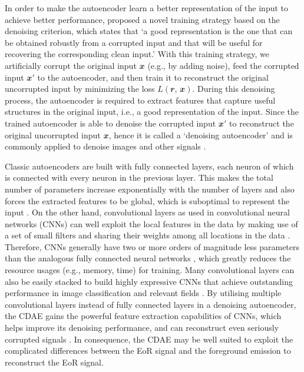 \documentclass[fleqn,usenatbib]{mnras}
\newcommand{\B}[1]{\mathbfit{#1}}
\newcommand{\editone}[1]{{\leavevmode\color{cyan}#1}}
\begin{document}
\editone{%
In order to make the autoencoder learn a better representation of the input
to achieve better performance, \citet{vincent2008,vincent2010} proposed a
novel training strategy based on the denoising criterion,
which states that `a good representation is the one that can be obtained
robustly from a corrupted input and that will be useful for recovering the
corresponding clean input.'
With this training strategy, we artificially corrupt the original input
$\B{x}$ (e.g., by adding noise), feed the corrupted input $\B{x}'$ to the
autoencoder, and then train it to reconstruct the original uncorrupted
input by minimizing the loss $L(\B{r}, \,\B{x})$.
During this denoising process, the autoencoder is required to extract
features that capture useful structures in the original input, i.e., a good
representation of the input.
Since the trained autoencoder is able to denoise the corrupted input
$\B{x}'$ to reconstruct the original uncorrupted input $\B{x}$, hence it is
called a `denoising autoencoder' and is commonly applied to denoise images
and other signals \citep[e.g.,][]{xie2012,bengio2013,gondara2016}.

Classic autoencoders are built with fully connected layers, each neuron of
which is connected with every neuron in the previous layer.
This makes the total number of parameters increase exponentially with the
number of layers and also forces the extracted features to be global, which
is suboptimal to represent the input \citep[e.g.,][]{masci2011}.
On the other hand, convolutional layers as used in convolutional neural
networks (CNNs) can well exploit the local features in the data by making
use of a set of small filters and sharing their weights among all
locations in the data \citep[e.g.,][]{lecun1998}.
Therefore, CNNs generally have two or more orders of magnitude less
parameters than the analogous fully connected neural networks
\citep[e.g.,][]{grais2017}, which greatly reduces the resource usages
(e.g., memory, time) for training.
Many convolutional layers can also be easily stacked to build highly
expressive CNNs that achieve outstanding performance in image
classification and relevant fields
\citep[e.g.,][]{krizhevsky2012,simonyan2014,szegedy2015,ma2018}.
By utilising multiple convolutional layers instead of fully connected
layers in a denoising autoencoder, the CDAE gains the powerful feature
extraction capabilities of CNNs, which helps improve its denoising
performance, and can reconstruct even seriously corrupted signals
\citep[e.g.,][]{du2017}.
In consequence, the CDAE may be well suited to exploit the complicated
differences between the EoR signal and the foreground emission to
reconstruct the EoR signal.
}  %
\end{document}
